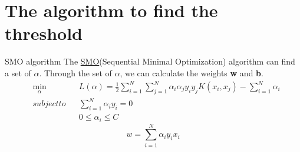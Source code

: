 \documentclass[10pt]{beamer}
\begin{document}
\section{The algorithm to find the threshold}


\begin{frame}{SMO algorithm}
The \href{https://www.microsoft.com/en-us/research/wp-content/uploads/2016/02/tr-98-14.pdf}{SMO}(Sequential Minimal Optimization) algorithm can find a set of $\alpha$.
Through the set of $ \alpha $, we can calculate the weights \textbf{w} and \textbf{b}.
\begin{equation}
    \begin{aligned}
   & \underset{\alpha}{\min}&&L(\alpha)=\frac{1}{2}\sum_{i=1}^{N}\sum_{j=1}^{N}
    \alpha_i\alpha_jy_iy_jK(x_i,x_j)-\sum_{i=1}^{N}\alpha_i \\
   & subject to &&\sum_{i=1}^{N}\alpha_iy_i=0 \\
   & && 0 \leq\alpha_i\leq C 
    \end{aligned}
    \label{Cons_cond}
\end{equation}
\begin{equation}
 w =\sum_{i=1}^N\alpha_i y_ix_i
 \end{equation}
\end{frame}
\end{document}
